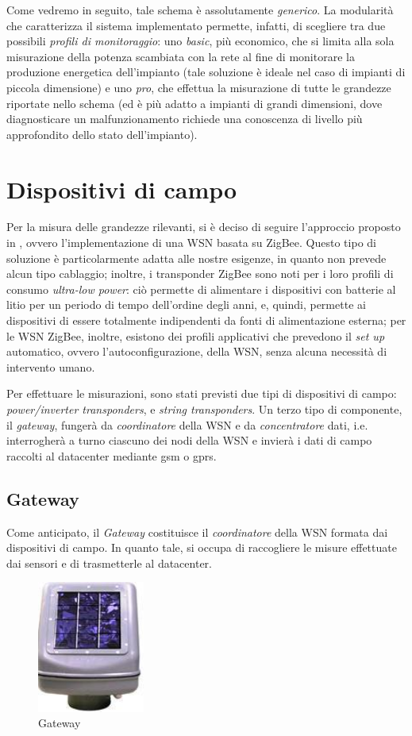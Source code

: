 %
Come vedremo in seguito, tale schema \`e assolutamente \emph{generico}. 
%
La modularit\`a che caratterizza il sistema implementato permette, infatti, 
di scegliere tra due possibili \emph{profili di monitoraggio}: uno \emph{basic}, 
pi\`u economico, che si limita alla sola misurazione della potenza scambiata con 
la rete al fine di monitorare la produzione energetica dell'impianto (tale soluzione 
\`e ideale nel caso di impianti di piccola dimensione) e uno \emph{pro}, che effettua 
la misurazione di tutte le grandezze riportate nello schema (ed \`e pi\`u adatto a 
impianti di grandi dimensioni, dove diagnosticare un malfunzionamento richiede 
una conoscenza di livello pi\`u approfondito dello stato dell'impianto).
%

%
\section{Dispositivi di campo}
Per la misura delle grandezze rilevanti, si \`e deciso di seguire l'approccio
proposto in \cite{xiaoli11}, ovvero l'implementazione di una WSN basata 
su ZigBee. 
%
Questo tipo di soluzione \`e particolarmente adatta alle nostre esigenze, 
in quanto non prevede alcun tipo cablaggio; inoltre, i transponder 
ZigBee sono noti per i loro profili di consumo \emph{ultra-low power}: 
ci\`o permette di alimentare i dispositivi con batterie al litio per un periodo 
di tempo dell'ordine degli anni, e, quindi, permette ai dispositivi di essere
totalmente indipendenti da fonti di alimentazione esterna; per le WSN ZigBee, inoltre, 
esistono dei profili applicativi che prevedono il \emph{set up} automatico, 
ovvero l'autoconfigurazione, della WSN, senza alcuna necessit\`a di intervento 
umano.
%

%
Per effettuare le misurazioni, sono stati previsti due tipi di dispositivi di 
campo: \emph{power/inverter transponders}, e \emph{string transponders}.
%
Un terzo tipo di componente, il \emph{gateway}, funger\`a da \emph{coordinatore}
della WSN e da \emph{concentratore} dati, i.e. interrogher\`a a turno ciascuno
dei nodi della WSN e invier\`a i dati di campo raccolti al datacenter mediante 
gsm o gprs.
%

%
\subsection{Gateway}
%
Come anticipato, il \emph{Gateway} costituisce il \emph{coordinatore} della 
WSN formata dai dispositivi di campo.
%
In quanto tale, si occupa di raccogliere le misure effettuate dai sensori 
e di trasmetterle al datacenter.
%
\begin{figure}[!h]
\centering
\includegraphics[width=100pt]{img/gw.jpg}
\caption{Gateway}
\label{gw}
\end{figure}
%

